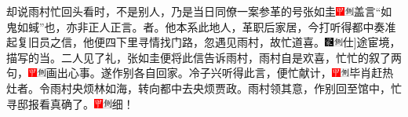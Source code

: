 却说雨村忙回头看时，不是别人，乃是当日同僚一案参革的号张如圭{\includegraphics[width=3mm]{../Images/00002}\includegraphics[width=3mm]{../Images/00011}\footnotesize \kaishu 盖言``如鬼如蜮''也，亦非正人正言。}者。他本系此地人，革职后家居，今打听得都中奏准起复旧员之信，他便四下里寻情找门路，忽遇见雨村，故忙道喜。{\includegraphics[width=3mm]{../Images/00006}\includegraphics[width=3mm]{../Images/00011}\footnotesize \kaishu {(此)}{[}仕{]}途宦境，描写的当。}二人见了礼，张如圭便将此信告诉雨村，雨村自是欢喜，忙忙的叙了两句，{\includegraphics[width=3mm]{../Images/00002}\includegraphics[width=3mm]{../Images/00011}\footnotesize \kaishu 画出心事。}遂作别各自回家。冷子兴听得此言，便忙献计，{\includegraphics[width=3mm]{../Images/00002}\includegraphics[width=3mm]{../Images/00011}\footnotesize \kaishu 毕肖赶热灶者。}令雨村央烦林如海，转向都中去央烦贾政。雨村领其意，作别回至馆中，忙寻邸报看真确了。{\includegraphics[width=3mm]{../Images/00002}\includegraphics[width=3mm]{../Images/00011}\footnotesize \kaishu 细！}

